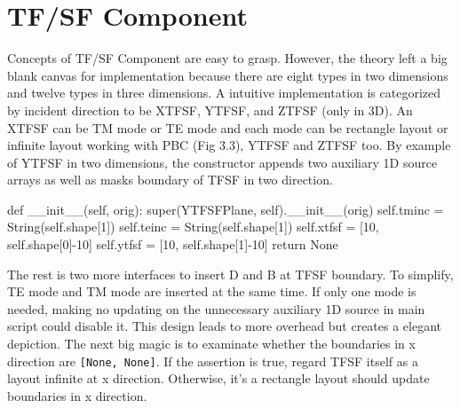 \section{TF/SF Component}
Concepts of TF/SF Component are easy to grasp. However, the theory left a big blank canvas for implementation because
there are eight types in two dimensions and twelve types in three dimensions. A intuitive implementation is categorized
by incident direction to be XTFSF, YTFSF, and ZTFSF (only in 3D). An XTFSF can be TM mode or TE mode and each mode can
be rectangle layout or infinite layout working with PBC (Fig 3.3), YTFSF and ZTFSF too. By example of YTFSF in two
dimensions, the constructor appends two auxiliary 1D source arrays as well as masks boundary of TFSF in two direction.
\begin{code}
    def __init__(self, orig):
        super(YTFSFPlane, self).__init__(orig)
        self.tminc = String(self.shape[1])
        self.teinc = String(self.shape[1])
        self.xtfsf = [10, self.shape[0]-10]
        self.ytfsf = [10, self.shape[1]-10]
        return None
\end{code}
The rest is two more interfaces to insert D and B at TFSF boundary. To simplify, TE mode and TM mode are inserted at the
same time. If only one mode is needed, making no updating on the unnecessary auxiliary 1D source in main script could
disable it. This design leads to more overhead but creates a elegant depiction. The next big magic is to examinate
whether the boundaries in x direction are \texttt{[None, None]}. If the assertion is true, regard TFSF itself as a
layout infinite at x direction. Otherwise, it's a rectangle layout should update boundaries in x direction.
